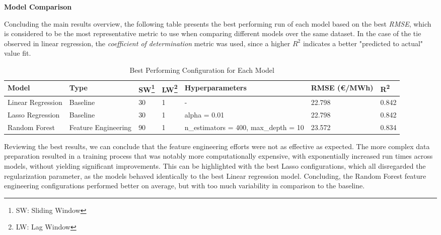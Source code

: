 \documentclass[12pt]{report} %
\begin{document}
\noindent \textbf{Model Comparison}

Concluding the main results overview, the following table presents the best performing run of each model based on the best \textit{RMSE}, which is considered to be the most representative metric to use when comparing different models over the same dataset. In the case of the tie observed in linear regression, the \textit{coefficient of determination} metric was used, since a higher $R^2$ indicates a better "predicted to actual" value fit.
\begin{table}[H]
	\caption{Best Performing Configuration for Each Model}
	\centering
	\begin{tabular}{|P{2cm}|P{2.1cm}|P{0.7cm}|P{0.7cm}|P{3.6cm}|P{1.8cm}|P{0.9cm}|}
		\hline
		\textbf{Model} & \textbf{Type} & \textbf{SW\footnote{SW: Sliding Window}} & \textbf{LW\footnote{LW: Lag Window}} & \textbf{Hyperparameters} & \textbf{RMSE (€/MWh)} & \textbf{R\textsuperscript{2}} \\
		\hline
		Linear Regression & Baseline & 30 & 1 & - & 22.798 & 0.842 \\
		\hline
		Lasso Regression & Baseline & 30 & 1 & alpha = 0.01 & 22.798 & 0.842 \\
		\hline
		Random Forest & Feature Engineering & 90 & 1 & n\_estimators = 400, max\_depth = 10 & 23.572 & 0.834 \\
		\hline
	\end{tabular}
\end{table}

Reviewing the best results, we can conclude that the feature engineering efforts were not as effective as expected. The more complex data preparation resulted in a training process that was notably more computationally expensive, with exponentially increased run times across models, without yielding significant improvements. This can be highlighted with the best Lasso configurations, which all disregarded the regularization parameter, as the models behaved identically to the best Linear regression model. Concluding, the Random Forest feature engineering configurations performed better on average, but with too much variability in comparison to the baseline.
\end{document}
